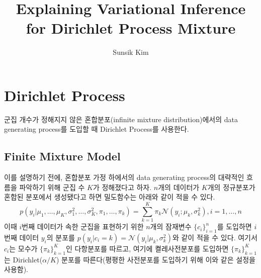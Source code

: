 \documentclass{article}
\title{Explaining Variational Inference for Dirichlet Process Mixture}
\author{Sunsik Kim}
\date{}
\begin{document}
\maketitle
\section{Dirichlet Process}
군집 개수가 정해지지 않은 혼합분포(infinite mixture distribution)에서의 data generating process를 도입할 때 Dirichlet Process를 사용한다.

\subsection{Finite Mixture Model}
이를 설명하기 전에, 혼합분포 가정 하에서의 data generating process의 대략적인 흐름을 파악하기 위해 군집 수 $K$가 정해졌다고 하자.
$n$개의 데이터가 $K$개의 정규분포가 혼합된 분포에서 생성됐다고 하면 밀도함수는 아래와 같이 적을 수 있다.
$$
    p\left(y_{i} | \mu_{1}, \ldots, \mu_{K}, \sigma_{1}^{2}, \ldots, \sigma_{K}^{2}, \pi_{1}, \ldots, \pi_{k}\right)=\sum_{k=1}^{K} \pi_{k} \mathcal{N}\left(y_{i} ; \mu_{k}, \sigma_{k}^{2}\right), i=1,\ldots,n
$$
이때 $i$번째 데이터가 속한 군집을 표현하기 위한 $n$개의 잠재변수 $\{c_i\}_{i=1}^n$를 도입하면 $i$번째 데이터 $y_i$의 분포를 $p(y_i|c_i=k)=\mathcal{N}(y_i|\mu_k,\sigma_k^2)$와 같이 적을 수 있다.
여기서 $c_i$는 모수가 $\{\pi_k\}_{k=1}^K$인 다항분포를 따르고, 여기에 켤레사전분포를 도입하면 $\{\pi_k\}_{k=1}^K$는 Dirichlet($\alpha/K$) 분포를 따른다(평평한 사전분포를 도입하기 위해 이와 같은 설정을 사용함).
\end{document}
